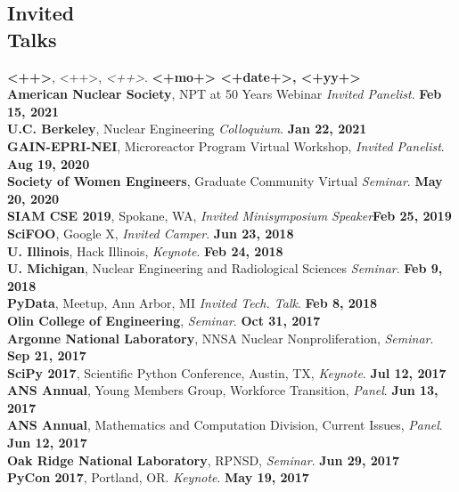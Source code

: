 \documentclass[margin,line]{resume}
\begin{document}
\begin{resume}
    \section{\mysidestyle Invited\\Talks}
    \textbf{<++>}, <++>, \emph{<++>}.  \hfill\textbf{<+mo+> <+date+>, <+yy+>}\\
    \textbf{American Nuclear Society}, NPT at 50 Years Webinar \emph{Invited Panelist}.  \hfill\textbf{Feb 15, 2021}\\
    \textbf{U.C. Berkeley}, Nuclear Engineering \emph{Colloquium}.  \hfill\textbf{Jan 22, 2021}\\
    \textbf{GAIN-EPRI-NEI}, Microreactor Program Virtual Workshop, \emph{Invited Panelist}.  \hfill\textbf{Aug 19, 2020}\\
    \textbf{Society of Women Engineers}, Graduate Community Virtual \emph{Seminar}.  \hfill\textbf{May 20, 2020}\\
    \textbf{SIAM CSE 2019}, Spokane, WA, \emph{Invited Minisymposium Speaker}\hfill\textbf{Feb 25, 2019}\\
      \textbf{SciFOO}, Google X, \emph{Invited Camper}.  \hfill\textbf{Jun 23, 2018}\\
      \textbf{U. Illinois}, Hack Illinois, \emph{Keynote}.  \hfill\textbf{Feb 24, 2018}\\
      \textbf{U. Michigan}, Nuclear Engineering and Radiological Sciences \emph{Seminar}.  \hfill\textbf{Feb 9, 2018}\\
      \textbf{PyData}, Meetup, Ann Arbor, MI \emph{Invited Tech. Talk}.  \hfill\textbf{Feb 8, 2018}\\
      \textbf{Olin College of Engineering}, \emph{Seminar}.  \hfill\textbf{Oct 31, 2017}\\
      \textbf{Argonne National Laboratory}, NNSA Nuclear Nonproliferation, \emph{Seminar}.  \hfill\textbf{Sep 21, 2017}\\
      \textbf{SciPy 2017}, Scientific Python Conference, Austin, TX, \emph{Keynote}.  \hfill\textbf{Jul 12, 2017}\\
      \textbf{ANS Annual}, Young Members Group, Workforce Transition, \emph{Panel}.  \hfill\textbf{Jun 13, 2017}\\
      \textbf{ANS Annual}, Mathematics and Computation Division, Current Issues, \emph{Panel}.  \hfill\textbf{Jun 12, 2017}\\
      \textbf{Oak Ridge National Laboratory}, RPNSD, \emph{Seminar}.  \hfill\textbf{Jun 29, 2017}\\
      \textbf{PyCon 2017}, Portland, OR. \emph{Keynote}.  \hfill\textbf{May 19, 2017}\\

\end{resume}
\end{document}
